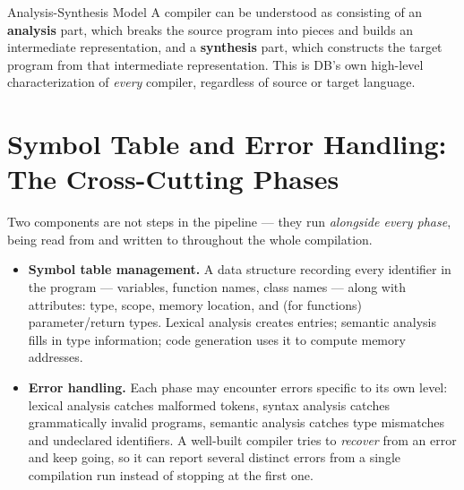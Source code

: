 \documentclass[11pt]{article}
\begin{document}
\begin{defbox}{Analysis-Synthesis Model}
A compiler can be understood as consisting of an \textbf{analysis} part, which breaks the
source program into pieces and builds an intermediate representation, and a \textbf{synthesis}
part, which constructs the target program from that intermediate representation. This is DB's
own high-level characterization of \emph{every} compiler, regardless of source or target
language.
\end{defbox}

\section{Symbol Table and Error Handling: The Cross-Cutting Phases}

\dbtag Two components are not steps in the pipeline --- they run \emph{alongside every phase},
being read from and written to throughout the whole compilation.

\begin{itemize}
  \item \textbf{Symbol table management.} A data structure recording every identifier in the
  program --- variables, function names, class names --- along with attributes: type, scope,
  memory location, and (for functions) parameter/return types. Lexical analysis creates entries;
  semantic analysis fills in type information; code generation uses it to compute memory
  addresses.
  \item \textbf{Error handling.} Each phase may encounter errors specific to its own level:
  lexical analysis catches malformed tokens, syntax analysis catches grammatically invalid
  programs, semantic analysis catches type mismatches and undeclared identifiers. A well-built
  compiler tries to \emph{recover} from an error and keep going, so it can report several
  distinct errors from a single compilation run instead of stopping at the first one.
\end{itemize}
\end{document}
